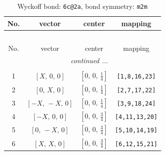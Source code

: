 \documentclass[fleqn,8pt]{jsarticle}
\begin{document}
\begin{longtable}{cccc}
\caption{Wyckoff bond: {\tt 6c@2a}, bond symmetry: {\tt m2m}}
 \\
 \hline \hline
No. & vector & center & mapping \\ \hline \endfirsthead

\multicolumn{3}{l}{\tablename\ \thetable{}} \\
 \hline \hline
No. & vector & center & mapping \\ \hline \endhead

 \hline \hline
\multicolumn{3}{r}{\footnotesize\it continued ...} \\ \endfoot

 \hline \hline
\multicolumn{3}{r}{} \\ \endlastfoot

1 & $\left[ X,\, 0,\, 0 \right]$ & $\left[ 0,\, 0,\, \frac{1}{4} \right]$ & {\tt [1,8,16,23]} \\ \hline
2 & $\left[ 0,\, X,\, 0 \right]$ & $\left[ 0,\, 0,\, \frac{1}{4} \right]$ & {\tt [2,7,17,22]} \\ \hline
3 & $\left[ - X,\, - X,\, 0 \right]$ & $\left[ 0,\, 0,\, \frac{1}{4} \right]$ & {\tt [3,9,18,24]} \\ \hline
4 & $\left[ - X,\, 0,\, 0 \right]$ & $\left[ 0,\, 0,\, \frac{3}{4} \right]$ & {\tt [4,11,13,20]} \\ \hline
5 & $\left[ 0,\, - X,\, 0 \right]$ & $\left[ 0,\, 0,\, \frac{3}{4} \right]$ & {\tt [5,10,14,19]} \\ \hline
6 & $\left[ X,\, X,\, 0 \right]$ & $\left[ 0,\, 0,\, \frac{3}{4} \right]$ & {\tt [6,12,15,21]} \\
\end{longtable}
\renewcommand{\arraystretch}{1.2}
\end{document}
